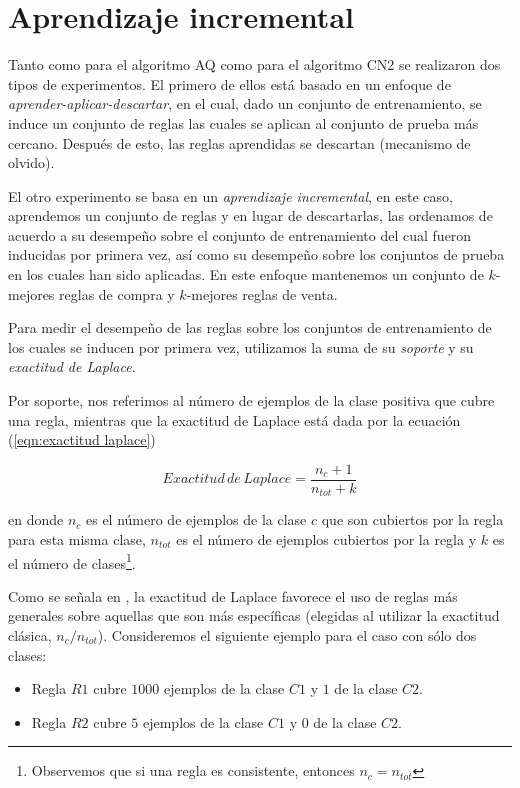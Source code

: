 \documentclass[12pt]{scrbook}
\theoremstyle{break}
\theoremstyle{break}
\begin{document}
\section{Aprendizaje incremental}
\label{seccion:aprendizaje incremental}
Tanto como para el algoritmo AQ como para el algoritmo CN2 se realizaron dos tipos de experimentos. El primero de ellos está basado en un enfoque de \textit{aprender-aplicar-descartar}, en el cual, dado un conjunto de entrenamiento, se induce un conjunto de reglas las cuales se aplican al conjunto de prueba más cercano. Después de esto, las reglas aprendidas se descartan (mecanismo de olvido).

El otro experimento se basa en un \textit{aprendizaje incremental}, en este caso, aprendemos un conjunto de reglas y en lugar de descartarlas, las ordenamos de acuerdo a su desempeño sobre el conjunto de entrenamiento del cual fueron inducidas por primera vez, así como su desempeño sobre los conjuntos de prueba en los cuales han sido aplicadas. En este enfoque mantenemos un conjunto de $k$-mejores reglas de compra y $k$-mejores reglas de venta.

Para medir el desempeño de las reglas sobre los conjuntos de entrenamiento de los cuales se inducen por primera vez, utilizamos la suma de su \textit{soporte} y su \textit{exactitud de Laplace}.

Por soporte, nos referimos al número de ejemplos de la clase positiva que cubre una regla, mientras que la exactitud de Laplace está dada por la ecuación (\ref{eqn:exactitud laplace})

\begin{equation}\label{eqn:exactitud laplace}
Exactitud\,de\,Laplace = \dfrac{ n_{c} + 1 }{ n_{tot} + k }
\end{equation}

en donde $n_c$ es el número de ejemplos de la clase $c$ que son cubiertos por la regla para esta misma clase, $n_{tot}$ es el número de ejemplos cubiertos por la regla y $k$ es el número de clases\footnote{Observemos que si una regla es consistente, entonces $n_c = n_{tot}$}.

Como se señala en \cite{CN2Improvements}, la exactitud de Laplace favorece el uso de reglas más generales sobre aquellas que son más específicas (elegidas al utilizar la exactitud clásica, $n_{c} / n_{tot} $). Consideremos el siguiente ejemplo para el caso con sólo dos clases:

\begin{itemize} 
\item Regla $R1$ cubre $1000$ ejemplos de la clase $C1$ y $1$ de la clase $C2$.

\item Regla $R2$ cubre $5$ ejemplos de la clase $C1$ y $0$ de la clase $C2$.
\end{itemize}
\end{document}

